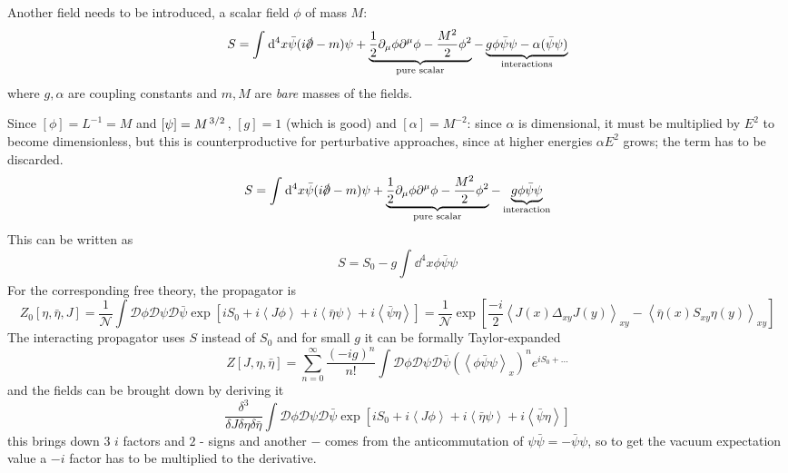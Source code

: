 Another field needs to be introduced, a scalar field $\phi$ of mass $M$:
\[
    S = \int_{}^{} \dd^4x \bar\psi(i\slashed{\pd}-m)\psi+\underbrace{
    \frac{1}{2}\pd_\mu\phi\pd^\mu\phi - \frac{M^2}{2}\phi^2}_\text{pure scalar}-
    \underbrace{g\phi\bar\psi\psi - \alpha(\bar\psi\psi)}_\text{interactions}
\]
where $g,\alpha$ are coupling constants and $m,M$ are \textit{bare} masses of the
fields.

Since $\left[\phi\right]=L^{-1}=M$ and $\left[\psi\right] = M^{\flatfrac{3}{2}}$,
$\left[g\right]=1$ (which is good) and $\left[\alpha\right]=M^{-2}$: since
$\alpha$ is dimensional, it must be multiplied by $E^2$ to become dimensionless,
but this is counterproductive for perturbative approaches, since at higher
energies $\alpha E^2$ grows; the term has to be discarded.
\[
    S = \int_{}^{} \dd^4x \bar\psi(i\slashed{\pd}-m)\psi+\underbrace{
    \frac{1}{2}\pd_\mu\phi\pd^\mu\phi - \frac{M^2}{2}\phi^2}_\text{pure scalar}-
    \underbrace{g\phi\bar\psi\psi}_\text{interaction}
\]
This can be written as
\[
    S = S_0 - g\int_{}^{} \dd^4x \phi\bar\psi\psi
\]
For the corresponding free theory, the propagator is
\[
    Z_0[\eta,\bar\eta,J] = \frac{1}{\mathcal{N}} \int \mathcal{D}\phi\mathcal{D}
    \psi\mathcal{D}\bar\psi \exp\left[ iS_0 + i\left\langle J\phi\right\rangle
    +i\left\langle\bar\eta\psi\right\rangle+i\left\langle\bar\psi\eta
    \right\rangle \right]=\frac{1}{\mathcal{N}}
    \exp\left[ \frac{-i}{2}\left\langle J(x)\Delta_{xy}J(y) \right\rangle_{xy}-
    \left\langle \bar\eta(x)S_{xy}\eta(y)\right\rangle_{xy}\right]
\]
The interacting propagator uses $S$ instead of $S_0$ and for small $g$ it can be
formally Taylor-expanded
\[
    Z[J,\eta,\bar\eta] = \sum_{n=0}^{\infty} \frac{(-ig)^n}{n!}\int \mathcal{D}\phi
    \mathcal{D}\psi\mathcal{D}\bar\psi
    (\left\langle\phi\bar\psi\psi\right\rangle_x)^n e^{iS_0+...}
\]
and the fields can be brought down by deriving it
\[
    \frac{\delta^3}{\delta J\delta\eta\delta\bar\eta}\int \mathcal{D}\phi
    \mathcal{D}\psi\mathcal{D}\bar\psi\exp\left[ iS_0 + i\left\langle J\phi
    \right\rangle+i\left\langle \bar\eta\psi\right\rangle +i\left\langle \bar\psi
    \eta\right\rangle\right] 
\]  
this brings down $3$ $i$ factors and $2$ - signs and another $-$ comes from the
anticommutation of $\psi\bar\psi = - \bar\psi\psi$, so to get the
vacuum expectation value a $-i$ factor has to be multiplied to the derivative.

